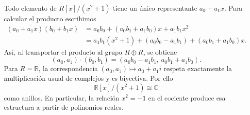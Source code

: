 \begin{ejem}
Todo elemento de $R[x]/(x^2+1)$ tiene un único representante $a_0+a_1x$. Para calcular el producto escribimos
\[
\begin{aligned}
(a_0+a_1x)(b_0+b_1x)
&=a_0b_0+(a_0b_1+a_1b_0)x+a_1b_1x^2\\
&=a_1b_1(x^2+1)+(a_0b_0-a_1b_1)+(a_0b_1+a_1b_0)x.
\end{aligned}
\]
Así, al transportar el producto al grupo $R\oplus R$, se obtiene
\[
(a_0,a_1)\cdot(b_0,b_1)
=(a_0b_0-a_1b_1,\ a_0b_1+a_1b_0).
\]
Para $R=\mathbb R$, la correspondencia $(a_0,a_1)\mapsto a_0+a_1i$ respeta exactamente la multiplicación usual de complejos y es biyectiva. Por ello
\[
\mathbb R[x]/(x^2+1)\cong\mathbb C
\]
como anillos. En particular, la relación $x^2=-1$ en el cociente produce esa estructura a partir de polinomios reales.
\end{ejem}
